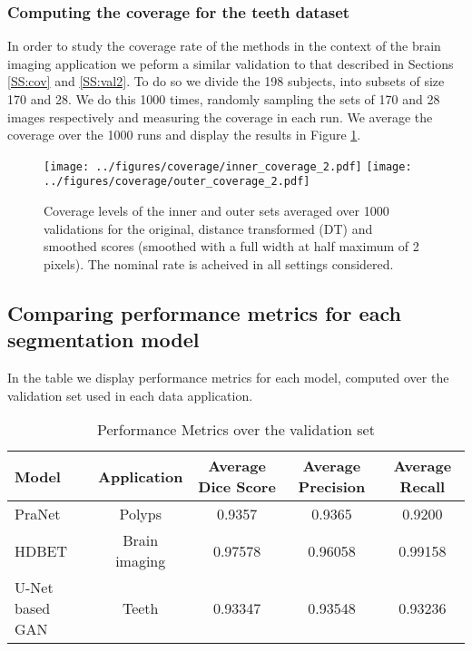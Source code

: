 \subsubsection{Computing the coverage for the teeth dataset}\label{val3}
In order to study the coverage rate of the methods in the context of the brain imaging application we peform a similar validation to that described in Sections \ref{SS:cov} and \ref{SS:val2}. To do so we divide the 198 subjects, into subsets of size 170 and 28. We do this 1000 times, randomly sampling the sets of 170 and 28 images respectively and measuring the coverage in each run. We average the coverage over the 1000 runs and display the results in Figure \ref{fig:coverage3}.
\begin{figure}[h!]
	\begin{center}
		\texttt{[image: ../figures/coverage/inner\_coverage\_2.pdf]}
		\texttt{[image: ../figures/coverage/outer\_coverage\_2.pdf]}
	\end{center}
	\caption{Coverage levels of the inner and outer sets averaged over 1000 validations for the original, distance transformed (DT) and smoothed scores (smoothed with a full width at half maximum of 2 pixels). The nominal rate is acheived in all settings considered.}\label{fig:coverage3}
\end{figure}

\newpage
\subsection{Comparing performance metrics for each segmentation model}\label{metrics}
In the table we display performance metrics for each model, computed over the validation set used in each data application. 
\begin{table}[h!]
	\centering
	\caption{Performance Metrics over the validation set}
	\begin{tabular}{@{}lcccc@{}}
		\toprule
		\textbf{Model} & Application &\textbf{Average Dice Score} & \textbf{Average Precision} & \textbf{Average Recall} \\ \midrule
		PraNet & Polyps & 0.9357 & 0.9365 & 0.9200 \\
		HDBET & Brain imaging & 0.97578
		 & 0.96058  & 0.99158 \\
		U-Net based GAN & Teeth & 0.93347 & 0.93548 & 0.93236 \\ \bottomrule
	\end{tabular}
	\label{tab:model_performance}
\end{table}


